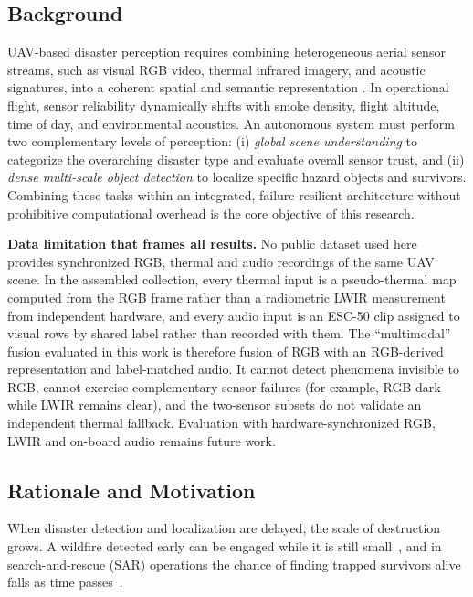 \documentclass[journal]{IEEEtran}
\begin{document}
\subsection{Background}

UAV-based disaster perception requires combining heterogeneous aerial sensor streams, such as visual RGB video, thermal infrared imagery, and acoustic signatures, into a coherent spatial and semantic representation \cite{merino2012unmanned, baltrusaitis2019multimodal}. In operational flight, sensor reliability dynamically shifts with smoke density, flight altitude, time of day, and environmental acoustics. An autonomous system must perform two complementary levels of perception: (i) \textit{global scene understanding} to categorize the overarching disaster type and evaluate overall sensor trust, and (ii) \textit{dense multi-scale object detection} to localize specific hazard objects and survivors. Combining these tasks within an integrated, failure-resilient architecture without prohibitive computational overhead is the core objective of this research.

\textbf{Data limitation that frames all results.} No public dataset used here provides synchronized RGB, thermal and audio recordings of the same UAV scene. In the assembled collection, every thermal input is a pseudo-thermal map computed from the RGB frame rather than a radiometric LWIR measurement from independent hardware, and every audio input is an ESC-50 clip assigned to visual rows by shared label rather than recorded with them. The ``multimodal'' fusion evaluated in this work is therefore fusion of RGB with an RGB-derived representation and label-matched audio. It cannot detect phenomena invisible to RGB, cannot exercise complementary sensor failures (for example, RGB dark while LWIR remains clear), and the two-sensor subsets do not validate an independent thermal fallback. Evaluation with hardware-synchronized RGB, LWIR and on-board audio remains future work.

\subsection{Rationale and Motivation}

When disaster detection and localization are delayed, the scale of destruction grows. A wildfire detected early can be engaged while it is still small~\cite{merino2012unmanned}, and in search-and-rescue (SAR) operations the chance of finding trapped survivors alive falls as time passes~\cite{erdelj2017help}.
\end{document}
